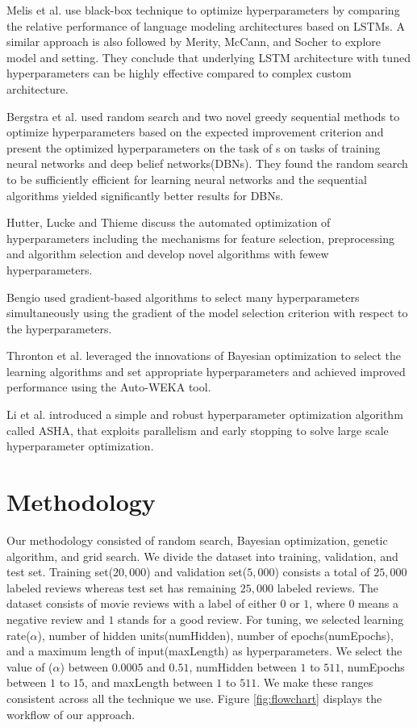 \documentclass[conference]{IEEEtran}
\begin{document}
Melis et al.\cite{melis} use  black-box technique\cite{blackbox} to optimize hyperparameters  by comparing the relative performance of language modeling architectures based on LSTMs. A similar approach is also followed by Merity, McCann, and Socher \cite{merita} to explore model and setting. They conclude that underlying LSTM architecture with tuned hyperparameters can be highly effective compared to complex custom architecture.

Bergstra et al.\cite{methods} used random search and two novel greedy sequential methods to optimize hyperparameters based on the expected improvement criterion and present the optimized hyperparameters on the task of s on tasks of training neural networks and deep belief networks(DBNs). They found the random search to be sufficiently efficient for learning neural networks and the sequential algorithms yielded significantly better results for DBNs.

Hutter, Lucke and Thieme \cite{hutter} discuss the automated optimization of hyperparameters including the mechanisms for feature selection, preprocessing and algorithm selection and develop novel algorithms with fewew hyperparameters.

Bengio used gradient-based algorithms to select many hyperparameters simultaneously using the gradient of the model selection criterion with respect to the hyperparameters\cite{bengio}.

Thronton et al.\cite{weka} leveraged the innovations of Bayesian optimization to select the learning algorithms and set appropriate hyperparameters and achieved  improved performance using the Auto-WEKA tool.

Li et al. \cite{asha} introduced a simple and robust hyperparameter optimization algorithm called ASHA, that exploits parallelism and early stopping to solve large scale hyperparameter optimization.

\section{Methodology}

Our methodology consisted of random search, Bayesian optimization, genetic algorithm, and grid search. We divide the dataset into training, validation, and test set. Training set($20,000$) and validation set($5,000$) consists a total of $25,000$ labeled reviews whereas test set has remaining $25,000$ labeled reviews. The dataset consists of movie reviews with a label of either $0$ or $1$, where $0$ means a negative review and $1$ stands for a good review. For tuning, we selected learning rate($\alpha$), number of hidden units(numHidden), number of epochs(numEpochs), and a maximum length of input(maxLength) as hyperparameters. We select the value of ($\alpha$) between $0.0005$ and $0.51$, numHidden between $1$ to $511$, numEpochs between $1$ to $15$,  and maxLength between $1$ to $511$. We make these ranges consistent across all the technique we use. Figure \ref{fig:flowchart} displays the workflow of our approach.
\end{document}
